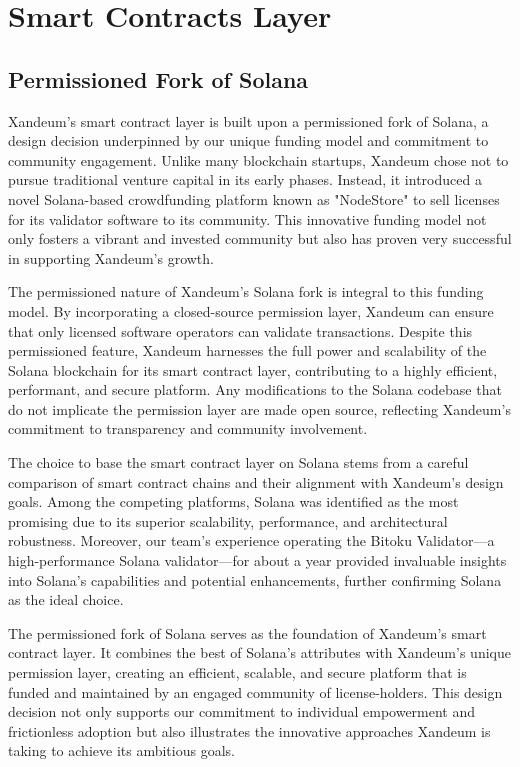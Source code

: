 \documentclass[11pt]{article}   	%
\let\oldsection\section
\renewcommand{\section}{\clearpage\oldsection}
\begin{document}
\section{Smart Contracts Layer}
\subsection{Permissioned Fork of Solana}
Xandeum's smart contract layer is built upon a permissioned fork of Solana, a design decision underpinned by our unique funding model and commitment to community engagement. Unlike many blockchain startups, Xandeum chose not to pursue traditional venture capital in its early phases. Instead, it introduced a novel Solana-based crowdfunding platform known as "NodeStore" to sell licenses for its validator software to its community. This innovative funding model not only fosters a vibrant and invested community but also has proven very successful in supporting Xandeum's growth.

The permissioned nature of Xandeum's Solana fork is integral to this funding model. By incorporating a closed-source permission layer, Xandeum can ensure that only licensed software operators can validate transactions. Despite this permissioned feature, Xandeum harnesses the full power and scalability of the Solana blockchain for its smart contract layer, contributing to a highly efficient, performant, and secure platform. Any modifications to the Solana codebase that do not implicate the permission layer are made open source, reflecting Xandeum's commitment to transparency and community involvement.

The choice to base the smart contract layer on Solana stems from a careful comparison of smart contract chains and their alignment with Xandeum's design goals. Among the competing platforms, Solana was identified as the most promising due to its superior scalability, performance, and architectural robustness. Moreover, our team's experience operating the Bitoku Validator—a high-performance Solana validator—for about a year provided invaluable insights into Solana's capabilities and potential enhancements, further confirming Solana as the ideal choice.

The permissioned fork of Solana serves as the foundation of Xandeum's smart contract layer. It combines the best of Solana's attributes with Xandeum's unique permission layer, creating an efficient, scalable, and secure platform that is funded and maintained by an engaged community of license-holders. This design decision not only supports our commitment to individual empowerment and frictionless adoption but also illustrates the innovative approaches Xandeum is taking to achieve its ambitious goals.
\end{document}
